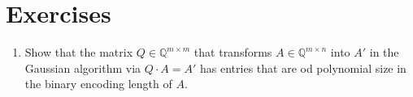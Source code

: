 \section*{Exercises} 
\label{sec:exercises}

\begin{enumerate}
\item \label{item:3} Show that the matrix $Q ∈ ℚ^{m × m}$ that transforms $A \in ℚ^{m × n}$ into $A'$ in the Gaussian algorithm via $Q ⋅A = A'$ has entries that are od polynomial size in the binary encoding length of $A$. 
\end{enumerate}


